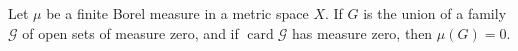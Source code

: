 Let $\mu$ be a finite Borel measure in a metric space $X$. If $G$ is the union of a family $\mathcal{G}$ of open sets of measure zero, and if $\operatorname{card} \mathcal{G}$ has measure zero, then $\mu(G) = 0$.
